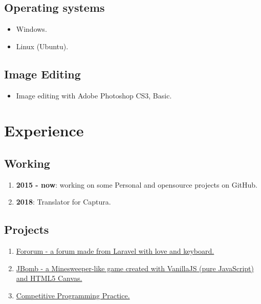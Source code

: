 \documentclass{article}
\begin{document}
        \subsection{Operating systems}
        \begin{itemize}
            \item Windows.
            \item Linux (Ubuntu).
        \end{itemize}

        \subsection{Image Editing}
        \begin{itemize}
            \item Image editing with Adobe Photoshop CS3, Basic.
        \end{itemize}

    \section{Experience}
        \subsection{Working}
            \begin{enumerate}
                \item \textbf{2015 - now}: working on some Personal and opensource projects on GitHub.
                \item \textbf{2018}: Translator for Captura\cite{Captura}.
            \end{enumerate}

       \subsection{Projects}
           \begin{enumerate}
               \item \href{https://github.com/trhgquan/Fororum}{Fororum - a forum made from Laravel with love and keyboard.}
               \item \href{https://github.com/trhgquan/JBomb}{JBomb - a Minesweeper-like game created with VanillaJS (pure JavaScript) and HTML5 Canvas.}
               \item \href{https://github.com/trhgquan/CPP}{Competitive Programming Practice.}
           \end{enumerate}
\end{document}
